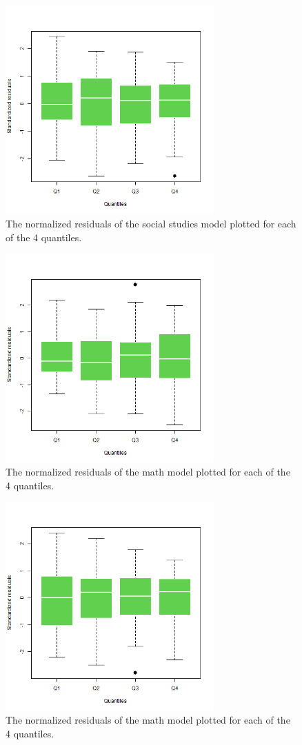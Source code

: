 \documentclass[10pt]{article}
\begin{document}
	\begin{figure}
		\includegraphics[width=8cm]{lm_socst_residual_boxplot.png}
		\centering
		\caption{The normalized residuals of the social studies model plotted for each of the 4 quantiles. }
		\label{fig::lm_socst_boxplot}
	\end{figure}

	\begin{figure}
		\includegraphics[width=8cm]{lm_math_nopeeking_residual_boxplot.png}
		\centering
		\caption{The normalized residuals of the math model plotted for each of the 4 quantiles. }
		\label{fig::lm_math_nopeeking_boxplot}
	\end{figure}

	\begin{figure}
		\includegraphics[width=8cm]{lm_socst_nopeeking_residual_boxplot.png}
		\centering
		\caption{The normalized residuals of the math model plotted for each of the 4 quantiles. }
		\label{fig::lm_socst_nopeeking_boxplot}
	\end{figure}
\end{document}
